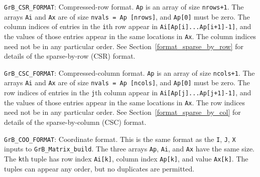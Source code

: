 \begin{packed_itemize}
    \item \verb'GrB_CSR_FORMAT': %
        Compressed-row format.  \verb'Ap' is an array of size \verb'nrows+1'.
        The arrays \verb'Ai' and \verb'Ax' are of size \verb'nvals = Ap [nrows]',
        and \verb'Ap[0]' must be zero.
        The column indices of entries in the \verb'i'th row appear in
        \verb'Ai[Ap[i]...Ap[i+1]-1]', and the values of those entries appear in
        the same locations in \verb'Ax'.
        The column indices need not be in any particular order.
        See Section~\ref{format_sparse_by_row} for details of the sparse-by-row (CSR) format.

    \item \verb'GrB_CSC_FORMAT': %
        Compressed-column format.  \verb'Ap' is an array of size \verb'ncols+1'.
        The arrays \verb'Ai' and \verb'Ax' are of size \verb'nvals = Ap [ncols]',
        and \verb'Ap[0]' must be zero.
        The row indices of entries in the \verb'j'th column appear in
        \verb'Ai[Ap[j]...Ap[j+1]-1]', and the values of those entries appear in
        the same locations in \verb'Ax'.
        The row indices need not be in any particular order.
        See Section~\ref{format_sparse_by_col} for details of the sparse-by-column (CSC) format.

    \item \verb'GrB_COO_FORMAT': %
        Coordinate format.  This is the same format as the \verb'I', \verb'J',
        \verb'X' inputs to \verb'GrB_Matrix_build'.  The three arrays
        \verb'Ap', \verb'Ai', and \verb'Ax' have the same size.  The \verb'k'th
        tuple has row index \verb'Ai[k]', column index \verb'Ap[k]', and value
        \verb'Ax[k]'.  The tuples can appear any order, but no duplicates are
        permitted.

%

\end{packed_itemize}

